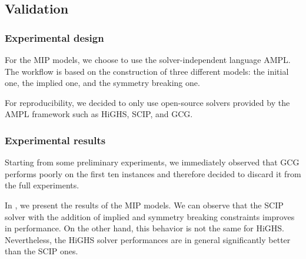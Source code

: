 \subsection{Validation}

\subsubsection{Experimental design}

For the MIP models, we choose to use the solver-independent language AMPL. The workflow is based on the construction of three different models: the initial one, the implied one, and the symmetry breaking one.

For reproducibility, we decided to only use open-source solvers provided by the AMPL framework such as HiGHS, SCIP, and GCG.


\subsubsection{Experimental results}

Starting from some preliminary experiments, we immediately observed that GCG performs poorly on the first ten instances and therefore decided to discard it from the full experiments.

In , we present the results of the MIP models. We can observe that the SCIP solver with the addition of implied and symmetry breaking constraints improves in performance. On the other hand, this behavior is not the same for HiGHS.
Nevertheless, the HiGHS solver performances are in general significantly better than the SCIP ones.

